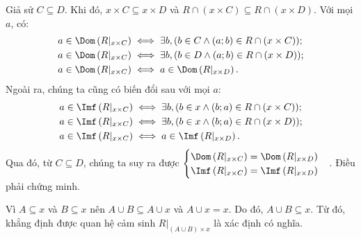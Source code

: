 \stepSubexercise Giả sử $C \subseteq D$. Khi đó, $x \times C \subseteq x \times D$ và $R \cap (x \times C) \subseteq R \cap (x \times D)$. Với mọi $a$, có:
\begin{align*}
   a \in \Dom\left(R|_{x \times C}\right) &\iff \exists b, (b \in C \land (a; b) \in R \cap (x \times C)); \\
   a \in \Dom\left(R|_{x \times C}\right) &\iff \exists b, (b \in D \land (a; b) \in R \cap (x \times D)); \\
   a \in \Dom\left(R|_{x \times C}\right) &\iff a \in \Dom\left(R|_{x \times D}\right).
\end{align*}
Ngoài ra, chúng ta cũng có biến đổi sau với mọi $a$:
\begin{align*}
   a \in \Imf\left(R|_{x \times C}\right) &\iff \exists b, (b \in x \land (b; a) \in R \cap (x \times C)); \\
   a \in \Imf\left(R|_{x \times C}\right) &\iff \exists b, (b \in x \land (b; a) \in R \cap (x \times D)); \\
   a \in \Imf\left(R|_{x \times C}\right) &\iff a \in \Imf\left(R|_{x \times D}\right).
\end{align*}
Qua đó, từ $C \subseteq D$, chúng ta suy ra được $\begin{cases}
   \Dom\left(R|_{x \times C}\right) = \Dom\left(R|_{x \times D}\right) \\
   \Imf\left(R|_{x \times C}\right) = \Imf\left(R|_{x \times D}\right)
\end{cases}$. Điều phải chứng minh.

\stepSubexercise Vì $A \subseteq x$ và $B \subseteq x$ nên $A \cup B \subseteq A \cup x$ và $A \cup x = x$. Do đó, $A \cup B \subseteq x$. Từ đó, khẳng định được quan hệ cảm sinh $R|_{(A \cup B) \times x}$ là xác định có nghĩa.

